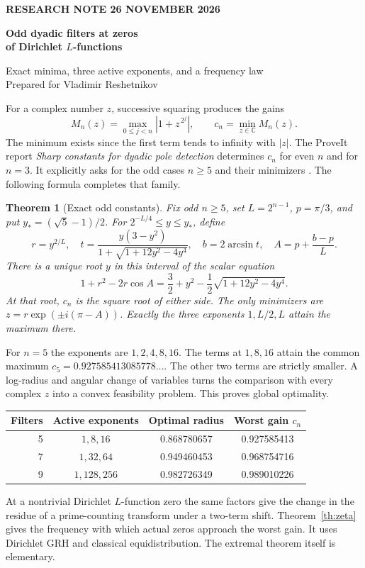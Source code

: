 \documentclass[11pt,letterpaper]{article}
\newtheorem{theorem}{Theorem}
\newcommand{\C}{\mathbb C}
\begin{document}
\thispagestyle{plain}
{\small\bfseries\color{accent} RESEARCH NOTE \hfill 26 NOVEMBER 2026}
\par\vspace{0.22in}
{\huge\bfseries\color{ink} Odd dyadic filters at zeros\\[2pt] of Dirichlet \(L\)-functions\par}
\vspace{7pt}
{\large Exact minima, three active exponents, and a frequency law}\\[3pt]
Prepared for Vladimir Reshetnikov
\par\medskip
For a complex number \(z\), successive squaring produces the gains
\[
 M_n(z)=\max_{0\le j<n}|1+z^{\,2^j}|,\qquad c_n=\min_{z\in\C}M_n(z).
\]
The minimum exists since the first term tends to infinity with \(|z|\).
The ProveIt report \emph{Sharp constants for dyadic pole detection} determines
\(c_n\) for even \(n\) and for \(n=3\). It explicitly asks for the odd cases
\(n\ge5\) and their minimizers \cite{packet}. The following formula completes that family.

\begin{theorem}[Exact odd constants]\label{th:main}
Fix odd \(n\ge5\), set \(L=2^{n-1}\), \(p=\pi/3\), and put
\(y_*=(\sqrt5-1)/2\). For \(2^{-L/4}\le y\le y_*\), define
\[
 r=y^{2/L},\quad t=\frac{y(3-y^2)}{1+\sqrt{1+12y^2-4y^4}},\quad
 b=2\arcsin t,\quad A=p+\frac{b-p}{L}.
\]
There is a unique root \(y\) in this interval of the scalar equation
\begin{equation}\label{eq:scalar}
  1+r^2-2r\cos A
   =\frac32+y^2-\frac12\sqrt{1+12y^2-4y^4}.
\end{equation}
At that root, \(c_n\) is the square root of either side. The only minimizers
are \(z=r\exp(\pm i(\pi-A))\). Exactly the three exponents \(1,L/2,L\)
attain the maximum there.
\end{theorem}

For \(n=5\) the exponents are \(1,2,4,8,16\).
The terms at \(1,8,16\) attain the common maximum \(c_5=0.927585413085778\ldots\).
The other two terms are strictly smaller. A log-radius and angular change
of variables turns the comparison with every complex \(z\) into a convex
feasibility problem. This proves global optimality.

\begin{center}\small
\begin{tabular}{rccc}
\toprule
Filters & Active exponents & Optimal radius & Worst gain \(c_n\)\\\midrule
5 & \(1,8,16\) & 0.868780657 & 0.927585413\\
7 & \(1,32,64\) & 0.949460453 & 0.968754716\\
9 & \(1,128,256\) & 0.982726349 & 0.989010226\\\bottomrule
\end{tabular}
\end{center}
At a nontrivial Dirichlet \(L\)-function zero the same factors give the
change in the residue of a prime-counting transform under a two-term shift.
Theorem~\ref{th:zeta} gives the frequency with which actual zeros approach
the worst gain. It uses Dirichlet GRH and classical equidistribution.
The extremal theorem itself is elementary.
\end{document}
